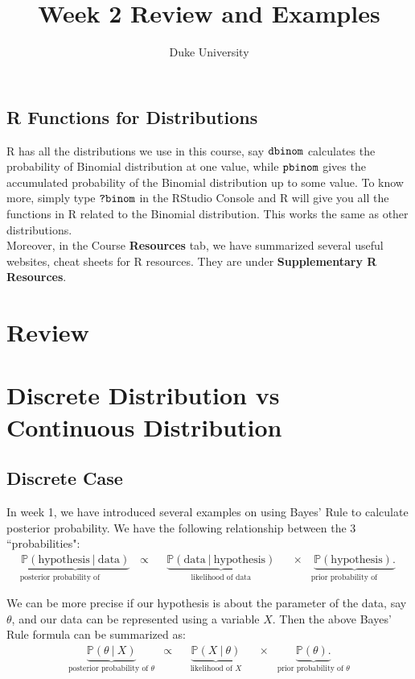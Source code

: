 \documentclass{article}
\begin{document}
\title{Week 2 Review and Examples}
\author{Duke University}
\date{}
\maketitle 

\subsection*{R Functions for Distributions}

R has all the distributions we use in this course, say $\verb|dbinom|$ calculates the probability of Binomial distribution at one value, while $\verb|pbinom|$ gives the accumulated probability of the Binomial distribution up to some value. To know more, simply type $\verb|?binom|$ in the RStudio Console and R will give you all the functions in R related to the Binomial distribution. This works the same as other distributions.\\

Moreover, in the Course \textbf{Resources} tab, we have summarized several useful websites, cheat sheets for R resources. They are under \textbf{Supplementary R Resources}.

\section*{Review}

\section{Discrete Distribution vs Continuous Distribution}

\subsection{Discrete Case}

In week 1, we have introduced several examples on using Bayes' Rule to calculate posterior probability. We have the following relationship between the 3 ``probabilities":
\begin{align*}
& \underbrace{\mathbb{P}(\text{hypothesis}~|~\text{data})}_\text{posterior probability of hypothesis} & \propto & & \underbrace{\mathbb{P}(\text{data}~|~\text{hypothesis})}_\text{likelihood of data} & & \times & \underbrace{\mathbb{P}(\text{hypothesis}).}_\text{prior probability of hypothesis} &
\end{align*}

We can be more precise if our hypothesis is about the parameter of the data, say $\theta$, and our data can be represented using a variable $X$. Then the above Bayes' Rule formula can be summarized as:
\begin{align*}
& \underbrace{\mathbb{P}(\theta~|~X)}_\text{posterior probability of $\theta$} & \propto & & \underbrace{\mathbb{P}(X~|~\theta)}_\text{likelihood of $X$} & & \times & \underbrace{\mathbb{P}(\theta).}_\text{prior probability of $\theta$} &
\end{align*}
\end{document}
